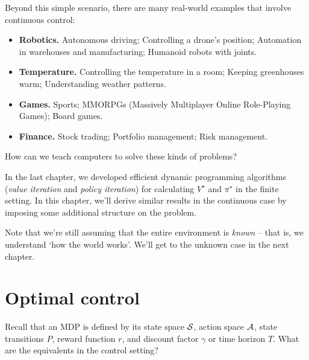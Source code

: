 \documentclass[../main/main]{subfiles}
\begin{document}
Beyond this simple scenario, there are many real-world examples that involve continuous control:
\begin{itemize}
    \item \textbf{Robotics.} Autonomous driving; Controlling a drone's position; Automation in warehouses and manufacturing; Humanoid robots with joints.
    \item \textbf{Temperature.} Controlling the temperature in a room; Keeping greenhouses warm; Understanding weather patterns.
    \item \textbf{Games.} Sports; MMORPGs (Massively Multiplayer Online Role-Playing Games); Board games.
    \item \textbf{Finance.} Stock trading; Portfolio management; Risk management.
\end{itemize}
How can we teach computers to solve these kinds of problems?

In the last chapter, we developed efficient dynamic programming algorithms (\emph{value iteration} and \emph{policy iteration})
for calculating $V^\star$ and $\pi^\star$ in the finite setting.
In this chapter, we'll derive similar results in the continuous case by imposing
some additional structure on the problem.

Note that we're still assuming that the entire environment is \emph{known} --
that is, we understand `how the world works'. We'll get to the unknown case in the next chapter.

\section{Optimal control}

Recall that an MDP is defined by its state space $\mathcal{S}$, action space $\mathcal{A}$, state transitions $P$, reward function $r$, and discount factor $\gamma$ or time horizon $T$. What are the equivalents in the control setting?
\end{document}
